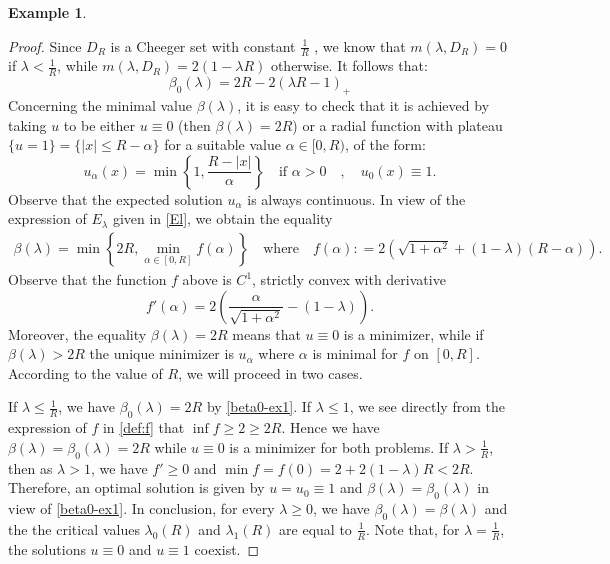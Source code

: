 \documentclass[reqno,11pt]{amsart}
\theoremstyle{definition}
\newtheorem{example}[theorem]{Example}
\numberwithin{equation}{section}
\newcommand{\minus}{\!-\!}
\newcommand{\1}{{{\bf 1}\kern-0,28em\rm l}}
\newcommand{\med}{\medskip\noindent}
\newcommand{\pare}[1]{\left(#1\right)}
\def\a{\alpha}
\def\l{\lambda}
\begin{document}
\begin{example}
\begin{proof}
Since $D_R$ is a Cheeger set with constant $\frac1{R}$ , we know that $m(\l,D_R) =0$  if $\l< \frac1{R}$,  while $m(\l,D_R)= 2(1 -\l R)$ otherwise. It follows that:
\begin{equation}\label{beta0-ex1}
\beta_0(\lambda) = 2R -2 (\l R-1)_+ 
\end{equation}
 Concerning the minimal value $\beta(\lambda)$, it is easy to check that it is achieved by taking $u$  to be either $u\equiv 0$ (then $\beta(\l)=2R$)
 or a radial function with plateau $\{u=1\}=\{|x|\le R-\a\}$  for a suitable value  $\alpha\in[0,R)$, of the form:   
 $$u_\alpha(x) = \min \left\{1, \frac{R-|x|}{\a} \right\}  \quad \text{if $\a>0$}\quad,\quad  u_0(x) \equiv 1.$$
 Observe that the expected solution $u_\a$ is always continuous. In view of the expression of $E_\l$ given in \eqref{El}, we obtain  the equality
 \begin{align}\label{def:f}
\beta(\l) = \min \left\{ 2R, \min_{\a\in [0,R]} f(\a) \right\} \quad \text{where}\quad f(\alpha): = 2 \pare{ \sqrt{1+\alpha^2} + (1\minus \l) (R\minus\a)}.
\end{align} 
Observe that the  function $f$ above is $C^1$, strictly convex with derivative
 $$f'(\alpha)= 2\pare{\frac{\alpha}{\sqrt{1+\alpha^2}}\minus(1\minus\lambda)}.$$
Moreover, the equality $\beta(\l)=2R$ means that $u\equiv 0$ is a minimizer, while if $\beta(\l)>2R$  the unique minimizer is
$u_\a$ where $\a$ is minimal for $f$ on $[0,R]$. According to the value of $R$, we will proceed in two cases.

\med {\bf Case $R\le 1.$\ }  If $\l \le \frac1{R}$,  we have $\beta_0(\l)=2R$ by \eqref{beta0-ex1}. If $\l\le 1$, we see directly  from the expression of $f$ in \eqref{def:f} that $ \inf f \ge 2 \ge 2R$.  Hence we have  $\beta(\l)=\beta_0(\l)=2R$ while  $u\equiv 0$ is a  minimizer for both problems.
If $\l > \frac1{R}$, then as $\l>1$, we have  $f'\ge 0$ and $\min f=f(0)=2 + 2(1-\l) R <2R $.
Therefore, an optimal solution is given by $u=u_0\equiv 1$ and $\beta(\l)= \beta_0(\l)$ in view of \eqref{beta0-ex1}.
In conclusion, for every $\l\ge 0$, we have $\beta_0(\l)= \beta(\l)$ and the the critical  values $\l_0(R)$ and $\l_1(R)$ are equal to 
$ \frac1{R}.$ Note that, for $\l=\frac1{R}$, the solutions $u\equiv 0$ and $u\equiv 1$ coexist.


\end{proof}
\end{example}
\end{document}
